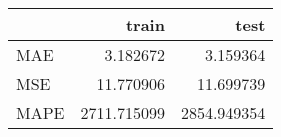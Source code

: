 \begin{tabular}{lrr}
\toprule
{} &        train &         test \\
\midrule
MAE  &     3.182672 &     3.159364 \\
MSE  &    11.770906 &    11.699739 \\
MAPE &  2711.715099 &  2854.949354 \\
\bottomrule
\end{tabular}
